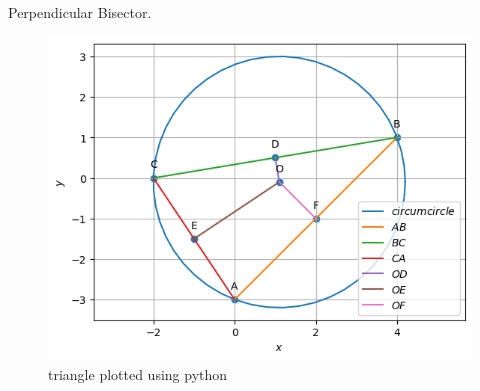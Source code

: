 \begin{table}[H]
        \centering
        
        \caption{Perpendicular Bisector.}
        \label{tab:perp-bisec}
    \end{table}
\begin{figure}[H]
	\includegraphics[width=\columnwidth]{perp_bisec/figs/perp_bisec.png}
\caption{triangle plotted using python}
\label{fig:i_perp_bisec_py}
\end{figure}

